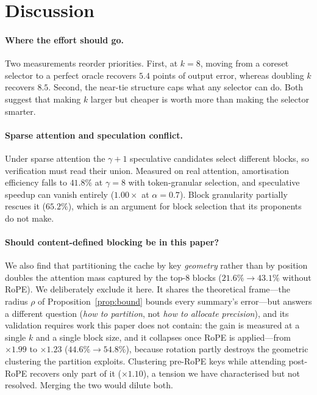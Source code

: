 \documentclass[sigconf,nonacm,11pt]{acmart}
\begin{document}
\section{Discussion}\label{sec:disc}

\paragraph{Where the effort should go.} Two measurements reorder priorities.
First, at $k=8$, moving from a coreset selector to a perfect
oracle recovers $5.4$ points of output error, whereas doubling $k$ recovers
$8.5$. Second, the near-tie structure caps what any selector can do. Both suggest
that making $k$ larger but cheaper is worth more than making the selector smarter.

\paragraph{Sparse attention and speculation conflict.} Under sparse attention the
$\gamma+1$ speculative candidates select different blocks, so verification must
read their union. Measured on real attention, amortisation efficiency falls to
$41.8\%$ at $\gamma=8$ with token-granular selection, and speculative speedup can
vanish entirely ($1.00\times$ at $\alpha=0.7$). Block granularity partially
rescues it ($65.2\%$), which is an argument for block selection that its
proponents do not make.

\paragraph{Should content-defined blocking be in this paper?} We also find that
partitioning the cache by key \emph{geometry} rather than by position doubles the
attention mass captured by the top-8 blocks ($21.6\%\to43.1\%$ without RoPE).
We deliberately exclude it here. It shares the theoretical frame---the radius
$\rho$ of Proposition~\ref{prop:bound} bounds every summary's error---but answers
a different question (\emph{how to partition}, not \emph{how to allocate
precision}), and its validation requires work this paper does not contain: the
gain is measured at a single $k$ and a single block size, and it collapses once
RoPE is applied---from $\times1.99$ to $\times1.23$ ($44.6\%\to54.8\%$), because
rotation partly destroys the geometric clustering the partition exploits.
Clustering pre-RoPE keys while attending post-RoPE recovers only part of it
($\times1.10$), a tension we have characterised but not resolved. Merging the two would dilute both.
\end{document}
